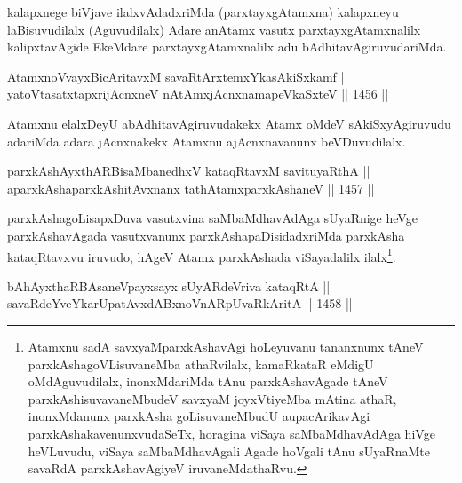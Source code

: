 \begin{artha}
kalapxnege biVjave ilalxvAdadxriMda (parxtayxgAtamxna) kalapxneyu laBisuvudilalx (Aguvudilalx) Adare anAtamx vasutx parxtayxgAtamxnalilx kalipxtavAgide EkeMdare parxtayxgAtamxnalilx adu bAdhitavAgiruvudariMda.
\end{artha}


\begin{shl}
AtamxnoV\s vayxBicAritavxM savaRtArx\s \s temxYkasAkiSxkamf || \\
yatoV\s tasatxtapxrijAcnxneV nA\s \s tAmx\s jAcnxnamapeVkaSxteV \hfill || 1456 ||
\end{shl}

\begin{artha}
Atamxnu elalxDeyU abAdhitavAgiruvudakekx Atamx oMdeV sAkiSxyAgiruvudu adariMda adara jAcnxnakekx Atamxnu ajAcnxnavanunx beVDuvudilalx.
\end{artha}


\begin{shl}
parxkAshAyxthARBisaMbanedhxV kataqRtavxM savituyaRthA ||  \\
aparxkAshaparxkAshitAvxnanx tathA\s \s tamxparxkAshaneV \hfill || 1457 ||  
\end{shl}

\begin{artha}
parxkAshagoLisapxDuva vasutxvina saMbaMdhavAdAga sUyaRnige heVge parxkAshavAgada vasutxvanunx parxkAshapaDisidadxriMda parxkAsha kataqRtavxvu iruvudo, hAgeV Atamx parxkAshada viSayadalilx ilalx\footnote{Atamxnu sadA savxyaMparxkAshavAgi hoLeyuvanu tananxnunx tAneV parxkAshagoVLisuvaneMba athaRvilalx, kamaRkataR eMdigU oMdAguvudilalx, inonxMdariMda tAnu parxkAshavAgade tAneV parxkAshisuvavaneMbudeV savxyaM joyxVtiyeMba mAtina athaR, inonxMdanunx parxkAsha goLisuvaneMbudU aupacArikavAgi parxkAshakavenunxvudaSeTx, horagina viSaya saMbaMdhavAdAga hiVge heVLuvudu, viSaya saMbaMdhavAgali Agade hoVgali tAnu sUyaRnaMte savaRdA parxkAshavAgiyeV iruvaneMdathaRvu.}.
\end{artha}

\begin{shl}
\footnotemark[2]bAhAyxthaRBAsaneV\s payxsayx sUyARdeVriva kataqRtA || \\
savaRdeYveYkarUpatAvxdABxnoVnARpUvaRkAritA \hfill || 1458 ||  
\end{shl}

